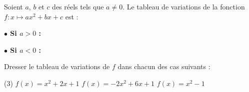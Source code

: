 \documentclass[10pt, a4paper]{article}
\begin{document}
\begin{Propriete}[]
Soient $a$, $b$ et $c$ des réels tels que $a \neq 0$.
Le tableau de variations de la fonction $f : x \mapsto ax^2 + bx + c$ est :

\vspace{0.2cm}
\noindent
\begin{minipage}[t]{0.48\linewidth}
\begin{center}
\textbf{$\bullet$ Si $a > 0$ :}
\end{center}
\vspace{0.1cm}
\begin{center}
\end{center}
\end{minipage}
\hfill
\begin{minipage}[t]{0.48\linewidth}
\begin{center}
\textbf{$\bullet$ Si $a < 0$ :}
\end{center}
\vspace{0.1cm}
\begin{center}
\end{center}
\end{minipage}
\end{Propriete}

\begin{Application}[][25 min]
Dresser le tableau de variations de $f$ dans chacun des cas suivants : 
\vspace{0.2cm}
\begin{tasks}[ label-width=15pt, item-indent=20pt](3)
    \task $f(x) = x^2 + 2x + 1$
    \task $f(x) = -2x^2 + 6x + 1$
    \task $f(x) = x^2 - 1$
\end{tasks}
\end{Application}
\end{document}
